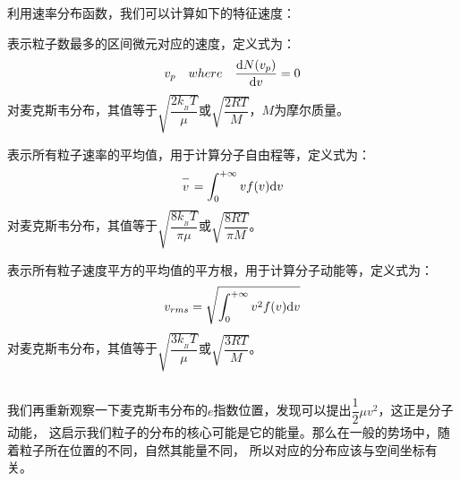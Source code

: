             利用速率分布函数，我们可以计算如下的特征速度：
            \begin{Itemize}
                \item {}表示粒子数最多的区间微元对应的速度，定义式为：
                \begin{equation}
                    v_{p} \quad where \quad \frac{\mathrm{d} N({v_{p}})}{\mathrm{d}{v}} = 0
                    \nonumber
                \end{equation}
                对麦克斯韦分布，其值等于$\sqrt{\dfrac{2k_{_B}T}{\mu}}$或$\sqrt{\dfrac{2RT}{M}}$，$M$为摩尔质量。
                \item {}表示所有粒子速率的平均值，用于计算分子自由程等，定义式为：
                \begin{equation}
                    \upperline{v} = \int_{0}^{+\infty} vf(v) \dif v
                    \nonumber
                \end{equation}
                对麦克斯韦分布，其值等于$\sqrt{\dfrac{8k_{_B}T}{\pi \mu}}$或$\sqrt{\dfrac{8RT}{\pi M}}$。
                \item {}表示所有粒子速度平方的平均值的平方根，用于计算分子动能等，定义式为：
                \begin{equation}
                    v_{rms} = \sqrt{\int_{0}^{+\infty} v^{2}f(v)\mathrm{d} v}
                    \nonumber
                \end{equation}
                对麦克斯韦分布，其值等于$\sqrt{\dfrac{3k_{_B}T}{\mu}}$或$\sqrt{\dfrac{3RT}{M}}$。
            \end{Itemize}
        \subsection[玻尔兹曼分布]{}
            我们再重新观察一下麦克斯韦分布的$e$指数位置，发现可以提出$\dfrac{1}{2}\mu v^{2}$，这正是分子动能，
            这启示我们粒子的分布的核心可能是它的能量。那么在一般的势场中，随着粒子所在位置的不同，自然其能量不同，
            所以对应的分布应该与空间坐标有关。

